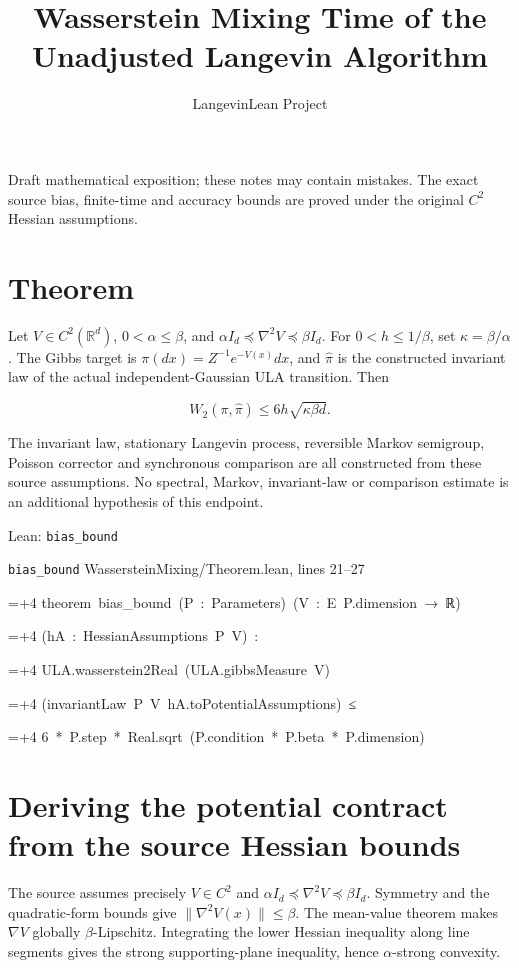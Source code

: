 \documentclass[11pt,a4paper]{article}
\title{\texorpdfstring{Wasserstein Mixing Time of the Unadjusted Langevin Algorithm}{Wasserstein Mixing Time of the Unadjusted Langevin Algorithm}}
\author{LangevinLean Project}
\date{}
\newlength{\leancharwidth}
\newenvironment{leancode}{\par\smallskip\begingroup\ttfamily\footnotesize\raggedright
  \settowidth{\leancharwidth}{M}\setlength{\parskip}{0pt}\setlength{\parindent}{0pt}
  \frenchspacing}{\par\endgroup\smallskip}
\newcommand{\leanline}[2]{\hangindent=\dimexpr#1\leancharwidth+4\leancharwidth\relax
  \hangafter=1\noindent\hspace*{#1\leancharwidth}#2\par}
\newcommand{\leansource}[1]{\par{\footnotesize\color{leanmuted}#1}\par}
\begin{document}
\maketitle
Draft mathematical exposition; these notes may contain mistakes.
The exact source bias, finite-time and accuracy bounds are proved under the original \(C^2\) Hessian assumptions.
\section{\texorpdfstring{Theorem}{Theorem}}


Let \(V\in C^2(\mathbb R^d)\), \(0<\alpha\le\beta\), and
\(\alpha I_d\preccurlyeq\nabla^2V\preccurlyeq\beta I_d\).
For \(0<h\le1/\beta\), set \(\kappa=\beta/\alpha\).
The Gibbs target is \(\pi(dx)=Z^{-1}e^{-V(x)}dx\), and
\(\widehat\pi\) is the constructed invariant law of the actual independent-Gaussian ULA transition. Then


\[W_2(\pi,\widehat\pi)\le6h\sqrt{\kappa\beta d}.\]


The invariant law, stationary Langevin process, reversible Markov semigroup,
Poisson corrector and synchronous comparison are all constructed from these
source assumptions. No spectral, Markov, invariant-law or comparison estimate
is an additional hypothesis of this endpoint.

\begin{leanbox}{Lean: \texttt{bias\_\allowbreak{}bound}}
\leansource{\texttt{bias\_\allowbreak{}bound} \quad WassersteinMixing/\allowbreak{}Theorem.lean, lines 21–27}
\begin{leancode}
\leanline{0}{theorem\ bias\_bound\ (P\ :\ Parameters)\ (V\ :\ E\ P.dimension\ →\ ℝ)}
\leanline{4}{(hA\ :\ HessianAssumptions\ P\ V)\ :}
\leanline{4}{ULA.wasserstein2Real\ (ULA.gibbsMeasure\ V)}
\leanline{6}{(invariantLaw\ P\ V\ hA.toPotentialAssumptions)\ ≤}
\leanline{8}{6\ *\ P.step\ *\ Real.sqrt\ (P.condition\ *\ P.beta\ *\ P.dimension)}
\end{leancode}
\end{leanbox}

\section{\texorpdfstring{Deriving the potential contract from the source Hessian bounds}{Deriving the potential contract from the source Hessian bounds}}


The source assumes precisely \(V\in C^2\) and
    \(\alpha I_d\preccurlyeq\nabla^2V\preccurlyeq\beta I_d\).
    Symmetry and the quadratic-form bounds give
    \(\|\nabla^2V(x)\|\le\beta\). The mean-value theorem makes
    \(\nabla V\) globally \(\beta\)-Lipschitz. Integrating the lower Hessian
    inequality along line segments gives the strong supporting-plane
    inequality, hence \(\alpha\)-strong convexity.
\end{document}
